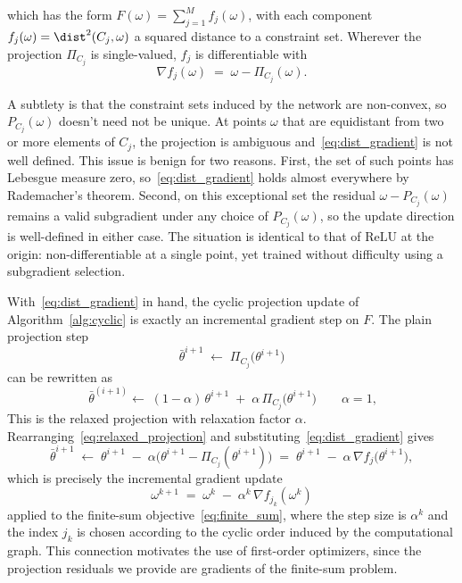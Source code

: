 \documentclass{article}
\begin{document}
which has the form $F(\omega) = \sum_{j=1}^{M} f_j(\omega)$, with each component $f_j(\omega) = \dist^{2}(C_j, \omega)$ a squared distance to a constraint set. Wherever the projection $\Pi_{C_j}$ is single-valued, $f_j$ is differentiable with
\begin{equation}
    \nabla f_j(\omega) \;=\; \omega - \Pi_{C_j}(\omega).
    \label{eq:dist_gradient}
\end{equation}

A subtlety is that the constraint sets induced by the network are non-convex, so $P_{C_j}(\omega)$ doesn't need not be unique. At points $\omega$ that are equidistant from two or more elements of $C_j$, the projection is ambiguous and~\eqref{eq:dist_gradient} is not well defined. This issue is benign for two reasons. First, the set of such points has Lebesgue measure zero, so~\eqref{eq:dist_gradient} holds almost everywhere by Rademacher's theorem. Second, on this exceptional set the residual $\omega - P_{C_j}(\omega)$ remains a valid subgradient under any choice of $P_{C_j}(\omega)$, so the update direction is well-defined in either case. The situation is identical to that of $\mathrm{ReLU}$ at the origin: non-differentiable at a single point, yet trained without difficulty using a subgradient selection.

With~\eqref{eq:dist_gradient} in hand, the cyclic projection update of Algorithm~\ref{alg:cyclic} is exactly an incremental gradient step on $F$. The plain projection step
\begin{equation}
    \bar \theta^{i+1} \;\gets\; \Pi_{C_j}\!\bigl(\theta^{i+1}\bigr)
    \label{eq:plain_projection}
\end{equation}
can be rewritten as
\begin{equation} \
    \bar \theta^{(i+1)}\gets\; (1-\alpha)\,\theta^{i+1} \;+\; \alpha\, \Pi_{C_j}\!\bigl(\theta^{i+1}\bigr)
    \qquad \alpha = 1,
    \label{eq:relaxed_projection}
\end{equation}
This is the relaxed projection with relaxation factor $\alpha$. Rearranging~\eqref{eq:relaxed_projection} and substituting~\eqref{eq:dist_gradient} gives
\begin{equation}
    \bar \theta^{i+1} \;\gets\; \theta^{i+1} \;-\; \alpha\bigl(\theta^{i+1} - \Pi_{C_j}(\theta^{i+1})\bigr) \;=\; \theta^{i+1} \;-\; \alpha\,\nabla f_j\!\bigl(\theta^{i+1}\bigr),
    \label{eq:projection_as_gradient_step}
\end{equation}
which is precisely the incremental gradient update~\cite[Eq.~(2.78)]{bertsekas1997nonlinear}
\begin{equation}
    \omega^{k+1} \;=\; \omega^{k} \;-\; \alpha^{k}\,\nabla f_{j_k}(\omega^{k})
    \label{eq:incremental_gradient}
\end{equation}
applied to the finite-sum objective~\eqref{eq:finite_sum}, where the step size is $\alpha^k$ and the index $j_k$ is chosen according to the cyclic order induced by the computational graph. This connection motivates the use of first-order optimizers, since the projection residuals we provide are gradients of the finite-sum problem.
\end{document}
